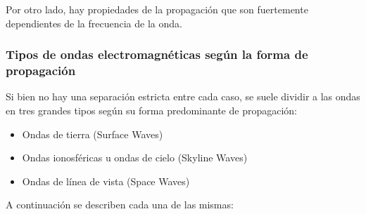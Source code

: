 Por otro lado, hay propiedades de la propagaci\'on que son fuertemente dependientes de la frecuencia de la onda. 



\subsubsection{Tipos de ondas electromagn\'eticas seg\'un la forma de propagaci\'on}
\label{sec:06.tipos.ondas.electromagneticas.segun.propagacion}

\begin{tcolorbox}
  Si bien no hay una separaci\'on estricta entre cada caso, se suele
  dividir a las ondas en tres grandes tipos seg\'un su forma
  predominante de propagaci\'on:

   \begin{itemize}
	\item Ondas de tierra (Surface Waves)
	\item Ondas ionosf\'ericas  u ondas de cielo (Skyline Waves)
	\item Ondas de l\'inea de vista (Space Waves)
        \end{itemize}
        
A continuaci\'on se describen cada una de las mismas:

\end{tcolorbox}

